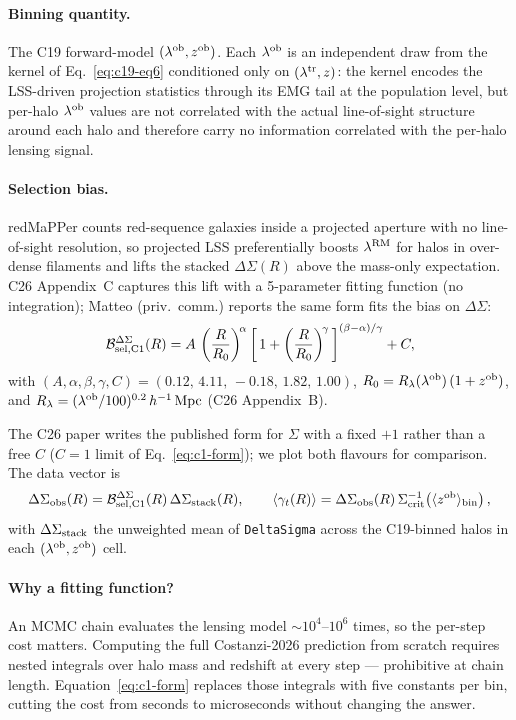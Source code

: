 \documentclass[a4paper, 11pt]{article}
\newcommand{\lob}{\lambda^{\rm ob}}
\newcommand{\ltr}{\lambda^{\rm tr}}
\newcommand{\lrm}{\lambda^{\rm RM}}
\newcommand{\zob}{z^{\rm ob}}
\newcommand{\hMpc}{h^{-1}\,\mathrm{Mpc}}
\newcommand{\Bcal}{\mathcal{B}}
\newcommand{\blk}[1]{\textcolor{datablockcol}{\texttt{#1}}}
\begin{document}
\paragraph{Binning quantity.} The C19 forward-model $(\lob, \zob)$.
Each $\lob$ is an independent draw from the kernel of
Eq.~\ref{eq:c19-eq6} conditioned only on $(\ltr, z)$: the kernel
encodes the LSS-driven projection statistics through its EMG tail at
the population level, but per-halo $\lob$ values are not correlated
with the actual line-of-sight structure around each halo and therefore
carry no information correlated with the per-halo lensing signal.

\paragraph{Selection bias.} redMaPPer counts red-sequence galaxies inside
a projected aperture with no line-of-sight resolution, so projected LSS
preferentially boosts $\lrm$ for halos in over-dense filaments and lifts
the stacked $\Delta\Sigma(R)$ above the mass-only expectation. C26
Appendix~C captures this lift with a 5-parameter fitting function (no
integration); Matteo (priv.\ comm.) reports the same form fits the bias
on $\Delta\Sigma$:
\begin{equation}
\label{eq:c1-form}
  \Bcal_{\rm sel,C1}^{\Delta\Sigma}(R)
  = A\,\left(\frac{R}{R_0}\right)^{\!\alpha}
    \left[\,1 + \left(\frac{R}{R_0}\right)^{\!\gamma}\,\right]^{(\beta - \alpha)/\gamma}
    + C,
\end{equation}
with $(A, \alpha, \beta, \gamma, C) = (0.12,\, 4.11,\, -0.18,\, 1.82,\, 1.00)$,
$R_0 = R_\lambda(\lob)\,(1+\zob)$, and
$R_\lambda = (\lob/100)^{0.2}\,\hMpc$ (C26 Appendix~B).

The C26 paper writes the published form for $\Sigma$ with a fixed $+1$
rather than a free $C$ ($C = 1$ limit of Eq.~\ref{eq:c1-form}); we plot
both flavours for comparison. The data vector is
\begin{equation}
  \label{eq:c1-data-vector}
  \Delta\Sigma_{\rm obs}(R) = \Bcal_{\rm sel,C1}^{\Delta\Sigma}(R)\,
    \Delta\Sigma_{\rm stack}(R),\qquad
  \langle \gamma_t(R) \rangle = \Delta\Sigma_{\rm obs}(R)\,
    \Sigma_{\rm crit}^{-1}\!\left(\langle\zob\rangle_{\rm bin}\right),
\end{equation}
with $\Delta\Sigma_{\rm stack}$ the unweighted mean of \blk{DeltaSigma}
across the C19-binned halos in each $(\lob, \zob)$ cell.

\paragraph{Why a fitting function?} An MCMC chain evaluates the lensing
model $\sim 10^4$--$10^6$ times, so the per-step cost matters. Computing
the full Costanzi-2026 prediction from scratch requires nested integrals
over halo mass and redshift at every step --- prohibitive at chain
length. Equation~\eqref{eq:c1-form} replaces those integrals with five
constants per bin, cutting the cost from seconds to microseconds without
changing the answer.
\end{document}
